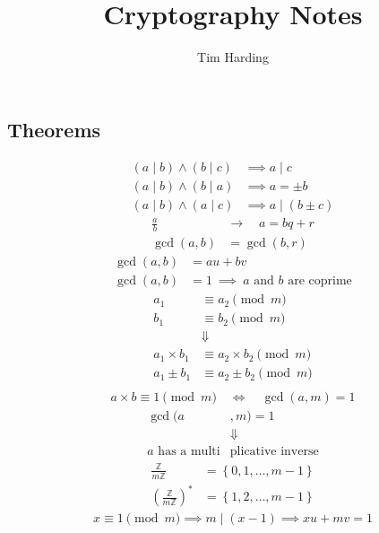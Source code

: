 \documentclass{article}
\title{Cryptography Notes}
\author{Tim Harding}
\newcommand{\curly}[1]{\left\{ #1 \right\}}
\newcommand{\soft}[1]{\left( #1 \right)}
\begin{document}
\begin{multicols*}{2}

\section*{Theorems}

\begin{align*}
    (a \mid b) \wedge (b \mid c) &\implies a \mid c \\
    (a \mid b) \wedge (b \mid a) &\implies a = \pm b \\
    (a \mid b) \wedge (a \mid c) &\implies a \mid (b \pm c)
\end{align*}
\begin{align*}
    \frac{a}{b} \quad &\longrightarrow  \quad a = bq + r \\
    \gcd(a, b) &= \gcd(b, r)
\end{align*}
\begin{align*}
    \gcd(a, b) &= au + bv \\
    \gcd(a, b) &= 1 \ \implies \ \text{$a$ and $b$ are coprime}
\end{align*}
\begin{align*}
    a_1 &\equiv a_2 \pmod{m} \\
    b_1 &\equiv b_2 \pmod{m} \\
    &\Downarrow \\
    a_1 \times b_1 &\equiv a_2 \times b_2 \pmod{m} \\
    a_1    \pm b_1 &\equiv a_2    \pm b_2 \pmod{m} \\
\end{align*}
\begin{align*}
    a \times b \equiv 1 \pmod{m} \quad \Leftrightarrow \quad \gcd(a, m) = 1
\end{align*}
\begin{align*}
    \gcd(a&, m) = 1 \\
    &\Downarrow \\
    \text{$a$ has a multi} & \text{plicative inverse}
\end{align*}
\begin{align*}
    \frac{\mathbb{Z}}{m\mathbb{Z}} &= \curly{0, 1, \ldots, m - 1} \\
    \soft{\frac{\mathbb{Z}}{m\mathbb{Z}}}^* &= \curly{1, 2, \ldots, m - 1}
\end{align*}
\begin{align*}
    x \equiv 1 \pmod{m} \implies m \mid (x - 1) \implies xu + mv = 1
\end{align*}
\begin{align*}

\end{align*}
\end{multicols*}
\end{document}
